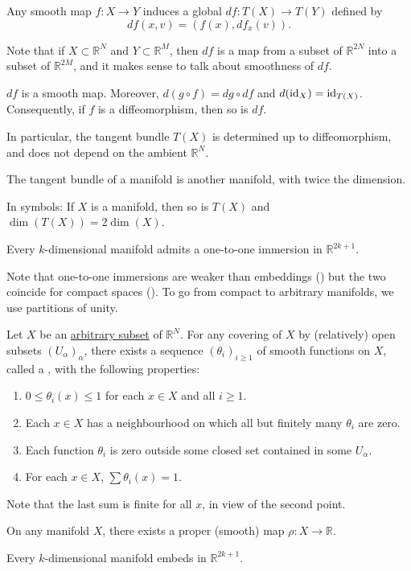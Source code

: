 \begin{defn}
	Any smooth map $f : X \to Y$ induces a global  $df : T(X) \to T(Y)$ defined by
	\begin{equation*} 
		df(x, v) = (f(x), df_{x}(v)).
	\end{equation*}
\end{defn}

Note that if $X \subset \mathbb{R}^{N}$ and $Y \subset \mathbb{R}^{M}$, then $df$ is a map from a subset of $\mathbb{R}^{2N}$ into a subset of $\mathbb{R}^{2M}$, and it makes sense to talk about smoothness of $df$.

\begin{prop}
	$df$ is a smooth map. Moreover, $d(g \circ f) = dg \circ df$ and $d(\operatorname{id}_{X}) = \operatorname{id}_{T(X)}$. Consequently, if $f$ is a diffeomorphism, then so is $df$.
\end{prop}
In particular, the tangent bundle $T(X)$ is determined up to diffeomorphism, and does not depend on the ambient $\mathbb{R}^{N}$.

\begin{prop}
	The tangent bundle of a manifold is another manifold, with twice the dimension.

	In symbols: If $X$ is a manifold, then so is $T(X)$ and $\dim(T(X)) = 2 \dim(X)$.
\end{prop}

\begin{thm}
	Every $k$-dimensional manifold admits a one-to-one immersion in $\mathbb{R}^{2k + 1}$.
\end{thm}
Note that one-to-one immersions are weaker than embeddings () but the two coincide for compact spaces (). To go from compact to arbitrary manifolds, we use partitions of unity.

\begin{thm}
	Let $X$ be an \underline{arbitrary subset} of $\mathbb{R}^{N}$. For any covering of $X$ by (relatively) open subsets $(U_{\alpha})_{\alpha}$, there exists a sequence $(\theta_{i})_{i \ge 1}$ of smooth functions on $X$, called a , with the following properties:
	\begin{enumerate}
		\item $0 \le \theta_{i}(x) \le 1$ for each $x \in X$ and all $i \ge 1$.
		\item Each $x \in X$ has a neighbourhood on which all but finitely many $\theta_{i}$ are zero.
		\item Each function $\theta_{i}$ is zero outside some closed set contained in some $U_{\alpha}$.
		\item For each $x \in X$, $\sum \theta_{i}(x) = 1$.	
	\end{enumerate}
\end{thm}
Note that the last sum is finite for all $x$, in view of the second point.

\begin{cor}
	On any manifold $X$, there exists a proper (smooth) map $\rho : X \to \mathbb{R}$.
\end{cor}

\begin{thm}
	Every $k$-dimensional manifold embeds in $\mathbb{R}^{2k + 1}$.
\end{thm}

